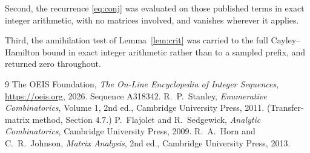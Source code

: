 \documentclass[11pt,a4paper]{article}
\theoremstyle{plain}
\theoremstyle{definition}
\begin{document}
Second, the recurrence \eqref{eq:conj} was evaluated on those published terms in exact
integer arithmetic, with no matrices involved, and vanishes wherever it applies.

Third, the annihilation test of Lemma~\ref{lem:crit} was carried to the full
Cayley--Hamilton bound in exact integer arithmetic rather than to a sampled prefix, and
returned zero throughout.

\begin{thebibliography}{9}
 The OEIS Foundation, \emph{The On-Line Encyclopedia of Integer
Sequences}, \url{https://oeis.org}, 2026. Sequence A318342.
 R.~P.~Stanley, \emph{Enumerative Combinatorics}, Volume 1, 2nd ed.,
Cambridge University Press, 2011. (Transfer-matrix method, Section 4.7.)
 P.~Flajolet and R.~Sedgewick, \emph{Analytic Combinatorics}, Cambridge
University Press, 2009.
 R.~A.~Horn and C.~R.~Johnson, \emph{Matrix Analysis}, 2nd ed., Cambridge
University Press, 2013.
\end{thebibliography}
\end{document}
